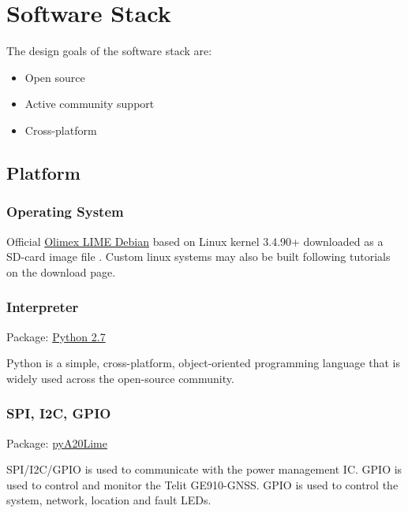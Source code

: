 \section{Software Stack}

The design goals of the software stack are:
\begin{itemize}
\item Open source
\item Active community support
\item Cross-platform
\end{itemize}

\subsection{Platform}
\subsubsection{Operating System}
Official \href{https://www.olimex.com/wiki/A20-OLinuXino-LIME#How_to_generate_boot-able_SD-card_Debian_Linux_image_for_A20-OLinuXino-LIME.3F}{Olimex LIME Debian} based on Linux kernel 3.4.90+ downloaded as a SD-card image file . Custom linux systems may also be built following tutorials on the download page.

\subsubsection{Interpreter}

Package:	\href{https://www.python.org/downloads/release/python-279/}{Python 2.7}

Python is a simple, cross-platform, object-oriented programming language that is widely used across the open-source community.

\subsubsection{SPI, I2C, GPIO}
	
Package:	\href{https://pypi.python.org/pypi/pyA20Lime}{pyA20Lime}

SPI/I2C/GPIO is used to communicate with the power management IC. GPIO is used to control and monitor the Telit GE910-GNSS. GPIO is used to control the system, network, location and fault LEDs.
    
    
    